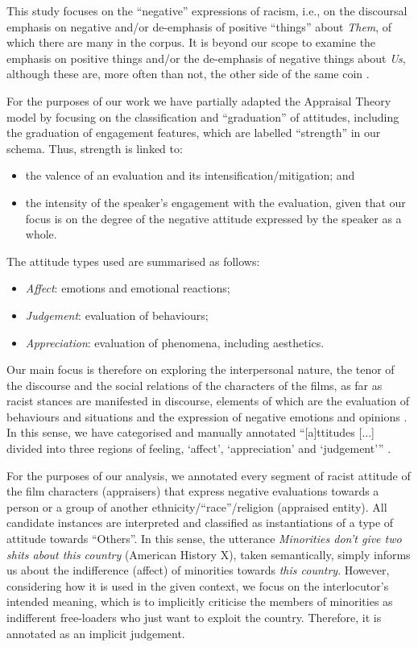 \documentclass[output=paper]{LSP/langsci}
\begin{document}
This study focuses on the “negative” expressions of racism, i.e., on the discoursal emphasis on negative and/or de-emphasis of positive “things” about \textit{Them}, of which there are many in the corpus. It is beyond our scope to examine the emphasis on positive things and/or the de-emphasis of negative things about \textit{Us}, although these are, more often than not, the other side of the same coin \citep[44]{Dijk2000b}.

For the purposes of our work we have partially adapted the Appraisal Theory model by focusing on the classification and “graduation” of attitudes, including the graduation of engagement features, which are labelled “strength” in our schema. Thus, strength is linked to:

\begin{itemize}
\item the valence of an evaluation and its intensification/mitigation; and
\item the intensity of the speaker's engagement with the evaluation, given that our focus is on the degree of the negative attitude expressed by the speaker as a whole.
\end{itemize}

The attitude types used are summarised as follows:
\begin{itemize}
\item \textit{Affect}: emotions and emotional reactions;
\item \textit{Judgement}: evaluation of behaviours;
\item \textit{Appreciation}: evaluation of phenomena, including aesthetics.
\end{itemize}

Our main focus is therefore on exploring the interpersonal nature, the tenor of the discourse and the social relations of the characters of the films, as far as racist stances are manifested in discourse, elements of which are the evaluation of behaviours and situations and the expression of negative emotions and opinions \citep[see][]{Fotopoulou2009}. In this sense, we have categorised and manually annotated “[a]ttitudes [...] divided into three regions of feeling, ‘affect’, ‘appreciation’ and ‘judgement’” \citep[35--43]{MartinWhite2005}. 

For the purposes of our analysis, we annotated every segment of racist attitude of the film characters (appraisers) that express negative evaluations towards a person or a group of another ethnicity/“race”/religion (appraised entity). All candidate instances are interpreted and classified as instantiations of a type of attitude towards “Others”. In this sense, the utterance \textit{Minorities don't give two shits about this country} (American History X), taken semantically, simply informs us about the indifference (affect) of minorities towards \textit{this country}. However, considering how it is used in the given context, we focus on the interlocutor’s intended meaning, which is to implicitly criticise the members of minorities as indifferent free-loaders who just want to exploit the country. Therefore, it is annotated as an implicit judgement.
\end{document}
